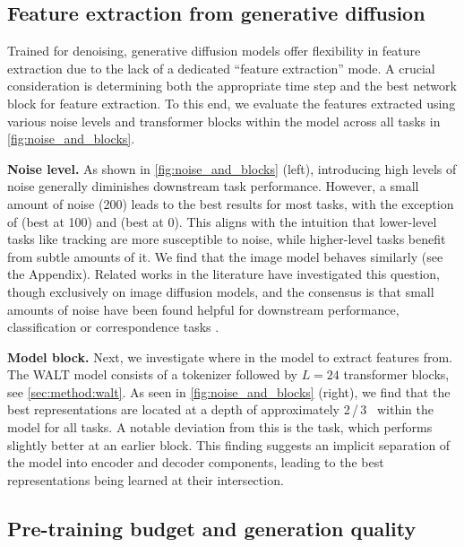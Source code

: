 



\subsection{Feature extraction from generative diffusion}
\label{sec:exp:featureextraction}

Trained for denoising, generative diffusion models offer flexibility in feature extraction due to the lack of a dedicated ``feature extraction'' mode.
A crucial consideration is determining both the appropriate time step and the best network block for feature extraction.
To this end, we evaluate the features extracted using various noise levels and transformer blocks within the model across all tasks in \cref{fig:noise_and_blocks}.

\noindent \textbf{Noise level.}
As shown in \cref{fig:noise_and_blocks} (left), introducing high levels of noise generally diminishes downstream task performance. However, a small amount of noise (200) leads to the best results for most tasks, with the exception of \Tpt (best at 100) and \Twaymo (best at 0). This aligns with the intuition that lower-level tasks like tracking are more susceptible to noise, while higher-level tasks benefit from subtle amounts of it.
We find that the image model \iwalt behaves similarly (see the Appendix).
Related works in the literature have investigated this question, though exclusively on image diffusion models, and the consensus is that small amounts of noise have been found helpful for downstream performance, \eg classification \cite{mukhopadhyay2023, xiang2023} or correspondence tasks \cite{luo2023dhf, tang2023}.


\noindent \textbf{Model block.}
Next, we investigate where in the model to extract features from.
The WALT model consists of a tokenizer followed by $L=24$ transformer blocks, see \cref{sec:method:walt}.
As seen in \cref{fig:noise_and_blocks} (right), we find that the best representations are located at a depth of approximately 2\,/\,3 \ within the model for all tasks. A notable deviation from this is the \Tpt task, which performs slightly better at an earlier block.
This finding suggests an implicit separation of the model into encoder and decoder components, leading to the best representations being learned at their intersection.



\subsection{Pre-training budget and generation quality}
\label{sec:exp:fvd}
\vspace{1mm}



